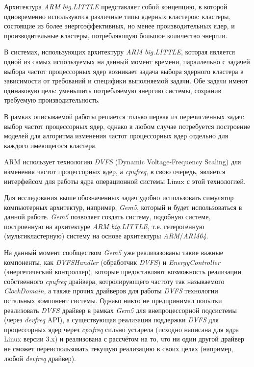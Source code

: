     Архитектура \textit{ARM big.LITTLE} представляет собой концепцию, в которой одновременно
    используются различные типы ядерных кластеров: кластеры, состоящие из более энергоэффективных,
    но менее производительных ядер, и производительные кластеры, потребляющую большое количество
    энергии.

    В системах, использующих архитектуру \textit{ARM big.LITTLE}, которая является одной из самых
    используемых на данный момент времени, параллельно с задачей выбора частот процессорных ядер
    возникает задача выбора ядерного кластера в зависимости от требований и специфики выполняемой
    задачи. Обе задачи имеют одинаковую цель: уменьшить потребляемую энергию системы, сохранив
    требуемую производительность.

    В рамках описываемой работы решается только первая из перечисленных задач: выбор частот
    процессорных ядер, однако в любом случае потребуется построение моделей для алгоритма
    изменения частот процессорных ядер отдельно для каждого имеющегося кластера.

    ARM использует технологию \textit{DVFS} (Dynamic Voltage-Frequency Scaling) для изменения
    частот процессорных ядер, а \textit{cpufreq}, в свою очередь, является интерфейсом
    для работы ядра операционной системы Linux с этой технологией.

    Для исследования выше обозначенных задач удобно использовать симулятор компьютерных
    архитектур, например, \textit{Gem5}, который и будет использоваться в данной работе.
    \textit{Gem5} позволяет создать систему, подобную системе, построенную на архитектуре
    \textit{ARM big.LITTLE}, т.е. гетерогенную (мультикластерную) систему на основе
    архитектуры \textit{ARM}/\textit{ARM64}.

    На данный момент сообществом \textit{Gem5} уже реализазованы такие важные компоненты,
    как \textit{DVFSHandler} (обработчик \textit{DVFS}) и \textit{EnergyController}
    (энергетический контроллер), которые предоставляют возможность реализации собственного
    \textit{cpufreq} драйвера, котролирующего частоту так называемого \textit{ClockDomain},
    а также прочих драйверов для работы \textit{DVFS} технологии
    остальных компонент системы. Однако никто не предпринимал попытки реализовать \textit{DVFS}
    драйвер в рамках \textit{Gem5} для внепроцессорной подсистемы (через \textit{devfreq} API),
    а существующая реализация поддержки \textit{DVFS} для процессорных ядер через \textit{cpufreq}
    сильно устарела (исходно написана для ядра Linux версии 3.x) и реализована с рассчётом на то,
    что ни один другой драйвер не сможет переиспользовать текущую реализацию в своих целях (например,
    любой \textit{devfreq} драйвер).

